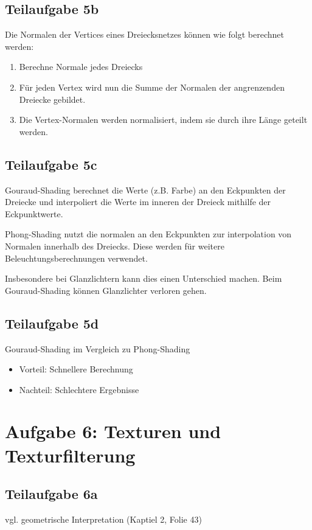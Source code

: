 \documentclass[a4paper]{scrartcl}
\begin{document}
\subsection*{Teilaufgabe 5b}
Die Normalen der Vertices eines Dreiecksnetzes können wie folgt berechnet werden:

\begin{enumerate}
    \item Berechne Normale jedes Dreiecks
    \item Für jeden Vertex wird nun die Summe der Normalen der angrenzenden Dreiecke gebildet.
    \item Die Vertex-Normalen werden normalisiert, indem sie durch ihre Länge geteilt werden.
\end{enumerate}

\subsection*{Teilaufgabe 5c}
Gouraud-Shading berechnet die Werte (z.B. Farbe) an den Eckpunkten der Dreiecke
und interpoliert die Werte im inneren der Dreieck mithilfe der Eckpunktwerte.

Phong-Shading nutzt die normalen an den Eckpunkten zur interpolation von
Normalen innerhalb des Dreiecks. Diese werden für weitere Beleuchtungsberechnungen
verwendet.

Insbesondere bei Glanzlichtern kann dies einen Unterschied machen. Beim
Gouraud-Shading können Glanzlichter verloren gehen.

\subsection*{Teilaufgabe 5d}
Gouraud-Shading im Vergleich zu Phong-Shading
\begin{itemize}
    \item Vorteil: Schnellere Berechnung
    \item Nachteil: Schlechtere Ergebnisse
\end{itemize}


\section*{Aufgabe 6: Texturen und Texturfilterung}
\subsection*{Teilaufgabe 6a}
vgl. geometrische Interpretation (Kaptiel 2, Folie 43)
\end{document}

